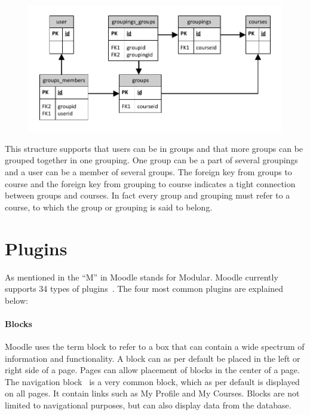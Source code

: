 \begin{figure}
	\centering
		\includegraphics[width=\textwidth]{images/moodlegroups}
	\label{fig:moodlegroupsandgroupings}
\end{figure}

This structure supports that users can be in groups and that more groups can be grouped together in one grouping. 
One group can be a part of several groupings and a user can be a member of several groups. 
The foreign key from groups to course and the foreign key from grouping to course indicates a tight connection between groups and courses.
In fact every group and grouping must refer to a course, to which the group or grouping is said to belong.

\section{Plugins}
\label{sub:plugins}
As mentioned in  the ``M'' in Moodle stands for Modular. 
Moodle currently supports 34 types of plugins~\cite{plugin}.
The four most common plugins are explained below:




\paragraph{Blocks}
\label{subsec:blocks}
Moodle uses the term block to refer to a box that can contain a wide spectrum of information and functionality.
A block can as per default be placed in the left or right side of a page. 
Pages can allow placement of blocks in the center of a page.
The navigation block~\cite{navigationblock} is a very common block, which as per default is displayed on all pages. 
It contain links such as My Profile and My Courses. 
Blocks are not limited to navigational purposes, but can also display data from the database.

